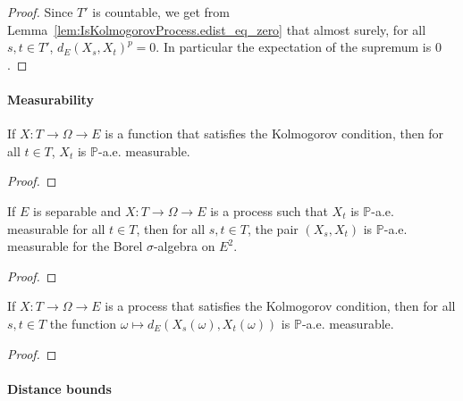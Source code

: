 \begin{proof}\leanok
Since $T'$ is countable, we get from Lemma~\ref{lem:IsKolmogorovProcess.edist_eq_zero} that almost surely, for all $s, t \in T'$, $d_E(X_s, X_t)^p = 0$.
In particular the expectation of the supremum is $0$.
\end{proof}


\paragraph{Measurability}

\begin{lemma}\label{lem:IsKolmogorovProcess.aemeasurable}
  \mathlibok
If $X : T \to \Omega \to E$ is a function that satisfies the Kolmogorov condition, then for all $t \in T$, $X_t$ is $\mathbb{P}$-a.e. measurable.
\end{lemma}

\begin{proof}
\end{proof}


\begin{lemma}\label{lem:aemeasurable_pair_of_aemeasurable}
  \leanok
If $E$ is separable and $X : T \to \Omega \to E$ is a process such that $X_t$ is $\mathbb{P}$-a.e. measurable for all $t \in T$, then for all $s, t \in T$, the pair $(X_s, X_t)$ is $\mathbb{P}$-a.e. measurable for the Borel $\sigma$-algebra on $E^2$.
\end{lemma}

\begin{proof}\leanok

\end{proof}


\begin{lemma}\label{lem:IsKolmogorovProcess.aemeasurable_edist}
  \mathlibok
If $X : T \to \Omega \to E$ is a process that satisfies the Kolmogorov condition, then for all $s,t \in T$ the function $\omega \mapsto d_E(X_s(\omega), X_t(\omega))$ is $\mathbb{P}$-a.e. measurable.
\end{lemma}

\begin{proof}
\end{proof}

\paragraph{Distance bounds}

